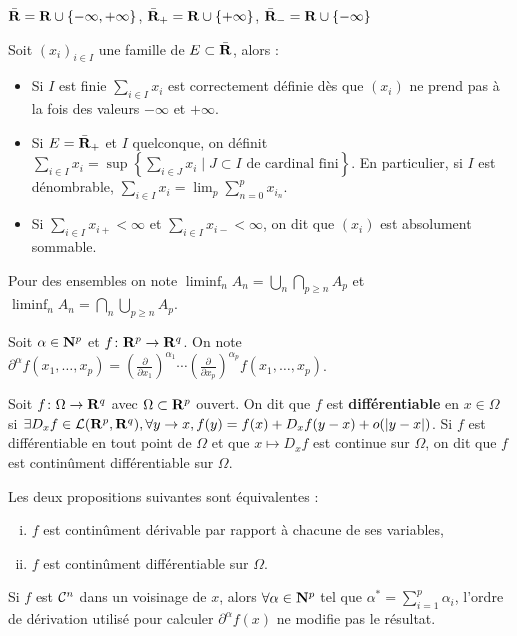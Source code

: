 \begin{note}
	$\bar {\mathbf{R}} = \mathbf{R} \cup \{ -\infty, +\infty \}$, $\bar {\mathbf{R}}_+ = \mathbf{R} \cup \{ +\infty \}$, $\bar {\mathbf{R}}_- = \mathbf{R} \cup \{ -\infty \}$
\end{note}

\begin{defn}
	Soit $(x_i)_{i \in I}$ une famille de $E \subset \bar {\mathbf{R}}$, alors :
	\begin{itemize}
	\item Si $I$ est finie $\sum_{i \in I} x_i$ est correctement définie dès que $(x_i)$ ne prend pas à la fois des valeurs $-\infty$ et $+\infty$.
	\item Si $E = \bar {\mathbf{R}}_+$ et $I$ quelconque, on définit $\sum_{i \in I} x_i = \sup \left\{ \sum_{i \in J} x_i \mid J \subset I \text{ de cardinal fini} \right\}$.
		En particulier, si $I$ est dénombrable, $\sum_{i \in I} x_i = \lim_p \sum_{n = 0}^p x_{i_n}$.
	\item Si $\sum_{i \in I} x_{i+} < \infty$ et $\sum_{i \in I} x_{i-} < \infty$, on dit que $(x_i)$ est absolument sommable.
	\end{itemize}
\end{defn}

\begin{defn}
	Pour des ensembles on note $\liminf_n A_n = \bigcup_n \bigcap_{p \geq n} A_p$ et $\liminf_n A_n = \bigcap_n \bigcup_{p \geq n} A_p$.
\end{defn}

\begin{note}
	Soit $\alpha \in \mathbf{N}^p$ et $f \colon \mathbf{R}^p \to \mathbf{R}^q$.
	On note $\partial^{\alpha} f(x_1,\ldots,x_p) = \left( \frac{\partial}{\partial x_1} \right)^{\alpha_1} \cdots \left( \frac{\partial}{\partial x_p} \right)^{\alpha_p} f(x_1,\ldots,x_p)$.
\end{note}

\begin{defn}
	Soit $f \colon \Omega \to \mathbf{R}^q$ avec $\Omega \subset \mathbf{R}^p$ ouvert.
	On dit que $f$ est \textbf{différentiable} en $x \in \Omega$ si $\exists D_x f \in \mathcal{L}(\mathbf{R}^p, \mathbf{R}^q), \forall y \to x, f(y) = f(x) + D_x f(y - x) + o(\left\lvert y - x\right\rvert)$.
	Si $f$ est différentiable en tout point de $\Omega$ et que $x \mapsto D_x f$ est continue sur $\Omega$, on dit que $f$ est continûment différentiable sur $\Omega$.
\end{defn}

\begin{thm}
	Les deux propositions suivantes sont équivalentes :
	\begin{enumerate}[(i)]
	\item $f$ est continûment dérivable par rapport à chacune de ses variables,
	\item $f$ est continûment différentiable sur $\Omega$.
	\end{enumerate}
\end{thm}

\begin{defn}
	Si $f$ est $\mathcal{C}^n$ dans un voisinage de $x$, alors $\forall \alpha \in \mathbf{N}^p$ tel que $\alpha^* = \sum_{i = 1}^p \alpha_i$, l'ordre de dérivation utilisé pour calculer $\partial^{\alpha} f(x)$ ne modifie pas le résultat.
\end{defn}